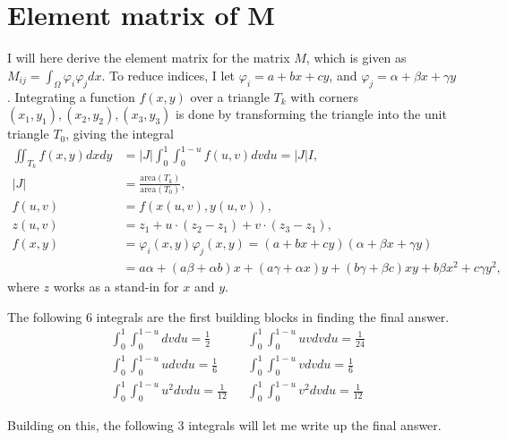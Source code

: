 \documentclass[aps, 12pt]{revtex4}
\begin{document}
\newpage
\appendix
\section{Element matrix of M} \label{apx:M}
I will here derive the element matrix for the matrix $M$, which is given as $M_{ij} = \int_{\Omega}\varphi_i\varphi_jdx$. To reduce indices, I let $\varphi_i=a+bx+cy$, and $\varphi_j=\alpha +\beta x + \gamma y$. Integrating a function $f(x, y)$ over a triangle $T_k$ with corners $(x_1, y_1), (x_2,y_2), (x_3,y_3)$ is done by transforming the triangle into the unit triangle $T_0$, giving the integral
\begin{align*}
    \iint_{T_k}f(x,y)dxdy & = |J|\int_0^1\int_0^{1-u}f(u, v)dvdu = |J|I,
    \\
    |J|                   & =\frac{\text{area}(T_k)}{\text{area}(T_0)},
    \\
    f(u, v)               & =f(x(u,v),y(u,v)),
    \\
    z(u, v)               & = z_1 + u\cdot(z_2-z_1)+v\cdot(z_3-z_1),
    \\
    f(x, y)               & = \varphi_i(x,y)\varphi_j(x,y)=(a+bx+cy)(\alpha+\beta x+\gamma y)
    \\
                          & = a\alpha+(a\beta+\alpha b)x+(a\gamma+\alpha x)y+(b\gamma+\beta c)xy+b\beta x^2+c\gamma y^2,
\end{align*}
where $z$ works as a stand-in for $x$ and $y$.

The following 6 integrals are the first building blocks in finding the final answer.
\begin{align*}
     & \int_0^1\int_0^{1-u}dvdu = \frac{1}{2}
     &                                            & \int_0^1\int_0^{1-u}uvdvdu = \frac{1}{24}
    \\
     & \int_0^1\int_0^{1-u}udvdu = \frac{1}{6}
     &                                            & \int_0^1\int_0^{1-u}vdvdu = \frac{1}{6}
    \\
     & \int_0^1\int_0^{1-u}u^2dvdu = \frac{1}{12}
     &                                            & \int_0^1\int_0^{1-u}v^2dvdu = \frac{1}{12}
\end{align*}

Building on this, the following 3 integrals will let me write up the final answer.
\end{document}
